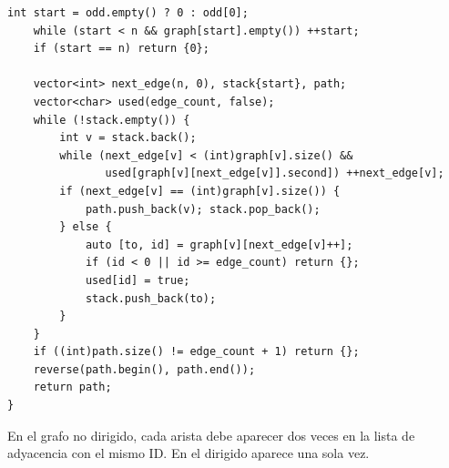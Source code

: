 \begin{lstlisting}[style=cpp]
    int start = odd.empty() ? 0 : odd[0];
    while (start < n && graph[start].empty()) ++start;
    if (start == n) return {0};

    vector<int> next_edge(n, 0), stack{start}, path;
    vector<char> used(edge_count, false);
    while (!stack.empty()) {
        int v = stack.back();
        while (next_edge[v] < (int)graph[v].size() &&
               used[graph[v][next_edge[v]].second]) ++next_edge[v];
        if (next_edge[v] == (int)graph[v].size()) {
            path.push_back(v); stack.pop_back();
        } else {
            auto [to, id] = graph[v][next_edge[v]++];
            if (id < 0 || id >= edge_count) return {};
            used[id] = true;
            stack.push_back(to);
        }
    }
    if ((int)path.size() != edge_count + 1) return {};
    reverse(path.begin(), path.end());
    return path;
}
\end{lstlisting}

En el grafo no dirigido, cada arista debe aparecer dos veces en la lista de
adyacencia con el mismo ID. En el dirigido aparece una sola vez.
